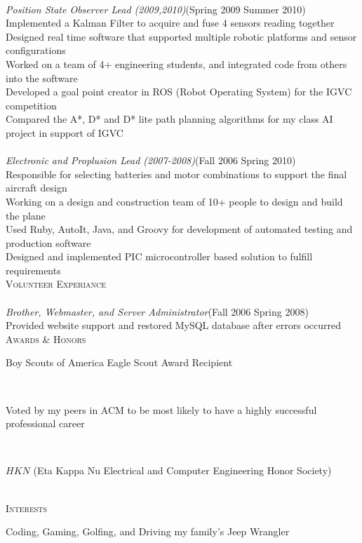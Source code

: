 \documentclass[10pt,letter,oneside]{article}
\newcommand{\SectionHeader}[1]{\textsc{#1} \vspace{-2px}\\}
\newcommand{\CompanyHeader}[4]{\hspace*{.52in}{\bf#1} \hfill #2 \\\hspace*{.5in}\emph{#3}\hfill (#4) \\}
\newcommand{\ResumeItem}[1]{\hspace*{.5in}\textopenbullet\hspace*{.2in}#1\\}
\newcommand{\TextBlock}[1]
{\hspace*{.5in} \begin{minipage}[t]{6.75in} #1 \end{minipage}\\}
\begin{document}
\CompanyHeader{Intelligent Ground Vehicle Competition (IGVC)}{}{Position State Observer Lead (2009,2010)}{Spring 2009 \textendash { }Summer 2010}
 \ResumeItem{Implemented a Kalman Filter to acquire and fuse 4 sensors reading together}
 \ResumeItem{Designed real time software that supported multiple robotic platforms and sensor configurations}
 \ResumeItem{Worked on a team of 4+ engineering students, and integrated code from others into the software}
 \ResumeItem{Developed a goal point creator in ROS (Robot Operating System) for the IGVC competition}
 \ResumeItem{Compared the A*, D* and D* lite path planning algorithms for my class AI project in support of IGVC}
 \CompanyHeader{Design Build Fly/DBF}{}{Electronic and Proplusion Lead (2007-2008)}{Fall 2006 \textendash { }Spring 2010}
 \ResumeItem{Responsible for selecting batteries and motor combinations to support the final aircraft design}
 \ResumeItem{Working on a design and construction team of 10+ people to design and build the plane}
 \ResumeItem{Used Ruby, AutoIt, Java, and Groovy for development of automated testing and production software} 
\ResumeItem{Designed and implemented PIC microcontroller based solution to fulfill requirements}
\SectionHeader{Volunteer Experiance}
 \CompanyHeader{Alpha Phi Omega (National Service Fraternity)}{}{Brother, Webmaster, and Server Administrator}{Fall 2006 \textendash { }Spring 2008}
 \ResumeItem{Provided website support and restored MySQL database after errors occurred}
\SectionHeader{Awards \& Honors}
\TextBlock{Boy Scouts of America Eagle Scout Award Recipient}
\TextBlock{Voted by my peers in ACM to be most likely to have a highly successful professional career}
\TextBlock{$HKN$ (Eta Kappa Nu Electrical and Computer Engineering Honor Society)}
\SectionHeader{Interests}
\TextBlock{Coding, Gaming, Golfing, and Driving my family’s Jeep Wrangler}
\end{document}
